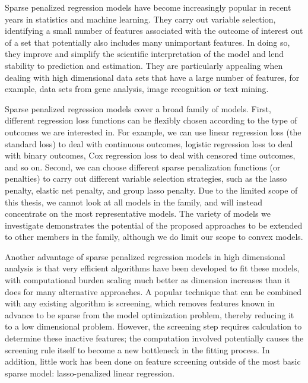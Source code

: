 \label{intro}

Sparse penalized regression models have become increasingly popular in recent years in statistics and machine learning. They carry out variable selection, identifying a small number of features associated with the outcome of interest out of a set that potentially also includes many unimportant features. In doing so, they improve and simplify the scientific interpretation of the model and lend stability to prediction and estimation. They are particularly appealing when dealing with high dimensional data sets that have a large number of features, for example, data sets from gene analysis, image recognition or text mining. 

Sparse penalized regression models cover a broad family of models. First, different regression loss functions can be flexibly chosen according to the type of outcomes we are interested in. For example, we can use linear regression loss (the standard loss) to deal with continuous outcomes, logistic regression loss to deal with binary outcomes, Cox regression loss to deal with censored time outcomes, and so on. Second, we can choose different sparse penalization functions (or penalties) to carry out different variable selection strategies, such as the lasso penalty, elastic net penalty, and group lasso penalty. Due to the limited scope of this thesis, we cannot look at all models in the family, and will instead concentrate on the most representative models. The variety of models we investigate demonstrates the potential of the proposed approaches to be extended to other members in the family, although we do limit our scope to convex models. 

Another advantage of sparse penalized regression models in high dimensional analysis is that very efficient algorithms have been developed to fit these models, with computational burden scaling much better as dimension increases than it does for many alternative approaches. A popular technique that can be combined with any existing algorithm is screening, which removes features known in advance to be sparse from the model optimization problem, thereby reducing it to a low dimensional problem. However, the screening step requires calculation to determine these inactive features; the computation involved potentially causes the screening rule itself to become a new bottleneck in the fitting process. In addition, little work has been done on feature screening outside of the most basic sparse model: lasso-penalized linear regression.

